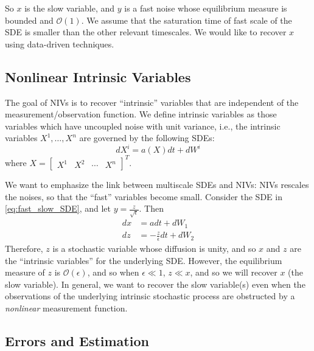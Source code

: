 \documentclass[1p]{elsarticle}
\begin{document}
So $x$ is the slow variable, and $y$ is a fast noise whose equilibrium measure is bounded and $\mathcal{O}(1)$.
%
We assume that the saturation time of fast scale  of the SDE is smaller than the other relevant timescales.
%
We would like to recover $x$ using data-driven techniques.


\subsection{Nonlinear Intrinsic Variables}

The goal of NIVs is to recover ``intrinsic'' variables that are independent of the measurement/observation function.
%
We define intrinsic variables as those variables which have uncoupled noise with unit variance,
i.e., the intrinsic variables $X^1, \dots, X^n$ are governed by the following SDEs:
\begin{equation} \label{eq:NIV_formulation}
dX^i = a(X) dt + dW^i
\end{equation}
where $X = \begin{bmatrix} X^1 & X^2 & \cdots & X^n \end{bmatrix}^T$.

We want to emphasize the link between multiscale SDEs and NIVs: NIVs rescales the noises, so that the ``fast'' variables become small.
%
Consider the SDE in \eqref{eq:fast_slow_SDE}, and let $y = \frac{z}{\sqrt{\epsilon}}$. 
%
Then
\begin{equation}
\begin{aligned}
dx &= adt + dW_1\\
dz &= -\frac{z}{\epsilon} dt +  dW_2
\end{aligned}
\end{equation}
%
Therefore, $z$ is a stochastic variable whose diffusion is unity, and so $x$ and $z$ are the ``intrinsic variables'' for the underlying SDE.
%
However, the equilibrium measure of $z$ is $\mathcal{O}(\epsilon)$, and so when $\epsilon \ll 1$, $z \ll x$, and so we will recover $x$ (the slow variable). 
%
In general, we want to recover the slow variable(s) even when the observations of the underlying intrinsic stochastic process are obstructed by a {\em nonlinear} measurement function. 

\subsection{Errors and Estimation}
\end{document}
